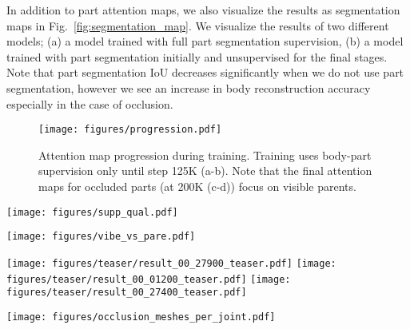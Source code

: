 \documentclass[10pt,twocolumn,letterpaper,usenames,dvipsnames]{article}
\newcommand{\methodname}{PARE\xspace}
\renewcommand{\ie}{i.e.\xspace}
\begin{document}
In addition to part attention maps, we also visualize the results as segmentation maps in Fig.~\ref{fig:segmentation_map}. We visualize the results of two different models; (a) a model trained with full part segmentation supervision, (b) a model trained with part segmentation initially and unsupervised for the final stages. Note that part segmentation IoU decreases significantly when we do not use part segmentation, however we see an increase in body reconstruction accuracy especially in the case of occlusion.
\begin{figure}[t]
	\centering
	\texttt{[image: figures/progression.pdf]}
\caption{Attention map progression during training. Training uses body-part supervision only until step 125K (a-b). Note that the final attention maps  for occluded parts (at 200K (c-d)) focus on visible parents.} \label{fig:attention_rebuttal}
\end{figure}{}

\newpage
\begin{figure*}
	\centering
	\texttt{[image: figures/supp\_qual.pdf]}
	\caption{\textbf{Qualitative comparison.} Here, we compare \methodname with recent state-of-the-art methods \ie SPIN~\cite{SPIN:ICCV:2019}, HMR-EFT~\cite{joo2020eft}, and Zhang \etal~\cite{zhangoohcvpr20}.}
	\label{fig:quali-results}
\end{figure*}{}

\begin{figure*}[t]
	\centering
	\texttt{[image: figures/vibe\_vs\_pare.pdf]}
	\caption{Comparison of VIBE~\cite{kocabas2019vibe} with our method, \methodname. Note that VIBE is a video-based method, while PARE is run on each video frame independently.}
	\label{fig:vibe}
\end{figure*}{}


\begin{figure*}[t]
	\centering
	\texttt{[image: figures/teaser/result\_00\_27900\_teaser.pdf]}
	\texttt{[image: figures/teaser/result\_00\_01200\_teaser.pdf]}
	\texttt{[image: figures/teaser/result\_00\_27400\_teaser.pdf]}
\caption{Occlusion Sensitivity Maps of SPIN \cite{SPIN:ICCV:2019} and \methodname}
	\label{fig:teaser-like}
\end{figure*}{}

\begin{figure*}[t]
	\centering
	\texttt{[image: figures/occlusion\_meshes\_per\_joint.pdf]}
\caption{Occlusion sensitivity meshes per joint.}
	\label{fig:occ_mesh_per_joint}
\end{figure*}{}
\end{document}
